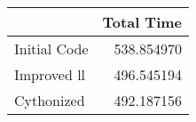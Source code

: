 \begin{tabular}{lr}
\toprule
{} &  Total Time \\
\midrule
Initial Code &  538.854970 \\
Improved ll  &  496.545194 \\
Cythonized   &  492.187156 \\
\bottomrule
\end{tabular}
